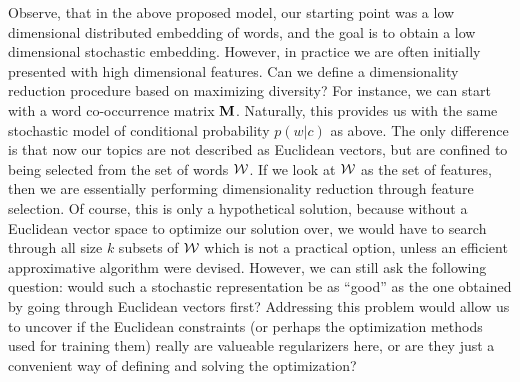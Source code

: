 \documentclass{article} %
\begin{document}
Observe, that in the above proposed model, our starting point was a low
dimensional distributed embedding of words, and the goal is to obtain
a low dimensional stochastic embedding. However, in practice we are
often initially presented with high dimensional features. Can we
define a dimensionality reduction procedure based on maximizing
diversity? For instance, we can start with a word co-occurrence matrix
$\operatorname{\mathbf{M}}$. Naturally, this provides us with the same stochastic model of
conditional probability $p(w|c)$ as above. The only difference is that
now our topics are not described as Euclidean vectors, but are
confined to being selected from the set of words ${\mathcal W}$. If we look at
${\mathcal W}$ as the set of features, then we are essentially performing
dimensionality reduction through feature selection. Of course, this is
only a hypothetical solution, because without a Euclidean vector space
to optimize our solution over, we would have to search through all
size $k$ subsets of ${\mathcal W}$ which is not a practical option, unless
an efficient approximative algorithm were devised. However, we can
still ask the following question: would such a stochastic
representation be as ``good'' as the one obtained by
going through Euclidean vectors first? Addressing this problem would
allow us to uncover if the Euclidean constraints (or perhaps the
optimization methods used for training them) really are valueable
regularizers here, or are they just a convenient way of defining and
solving the optimization? 



\end{document}
